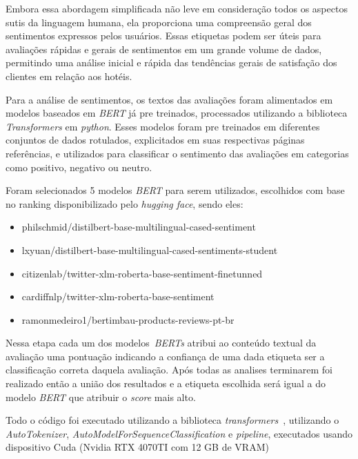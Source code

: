 Embora essa abordagem simplificada não leve em consideração todos os aspectos sutis da linguagem humana, ela proporciona uma compreensão geral dos sentimentos expressos pelos usuários. Essas etiquetas podem ser úteis para avaliações rápidas e gerais de sentimentos em um grande volume de dados, permitindo uma análise inicial e rápida das tendências gerais de satisfação dos clientes em relação aos hotéis.

Para a análise de sentimentos, os textos das avaliações foram alimentados em modelos baseados em \textit{BERT} já pre treinados, processados utilizando a biblioteca \textit{Transformers} em \textit{python}. Esses modelos foram pre treinados em diferentes conjuntos de dados rotulados, explicitados em suas respectivas páginas referências, e utilizados para classificar o sentimento das avaliações em categorias como positivo, negativo ou neutro.

Foram selecionados 5 modelos \textit{BERT} para serem utilizados, escolhidos com base no ranking disponibilizado pelo \textit{hugging face}, sendo eles:

\begin{itemize}
	\item philschmid/distilbert-base-multilingual-cased-sentiment \cite{Sanh2019DistilBERTAD}
	\item lxyuan/distilbert-base-multilingual-cased-sentiments-student \cite{lik_xun_yuan_2023}
	\item citizenlab/twitter-xlm-roberta-base-sentiment-finetunned \cite{robertaCitizenlab2022}
	\item cardiffnlp/twitter-xlm-roberta-base-sentiment \cite{barbieri2022xlmtmultilinguallanguagemodels}
	\item ramonmedeiro1/bertimbau-products-reviews-pt-br \cite{bertimbauRamon2023}
\end{itemize}

Nessa etapa cada um dos modelos~\textit{BERTs} atribui ao conteúdo textual da avaliação uma pontuação indicando a confiança de uma dada etiqueta ser a classificação correta daquela avaliação. Após todas as analises terminarem foi realizado então a união dos resultados e a etiqueta escolhida será igual a do modelo \textit{BERT} que atribuir o \emph{score} mais alto.

Todo o código foi executado utilizando a biblioteca \textit{transformers}~\cite{Wolf_Transformers_State-of-the-Art_Natural_2020}, utilizando o \textit{AutoTokenizer}, \textit{AutoModelForSequenceClassification} e \textit{pipeline}, executados usando dispositivo Cuda (Nvidia RTX 4070TI com 12 GB de VRAM) %


